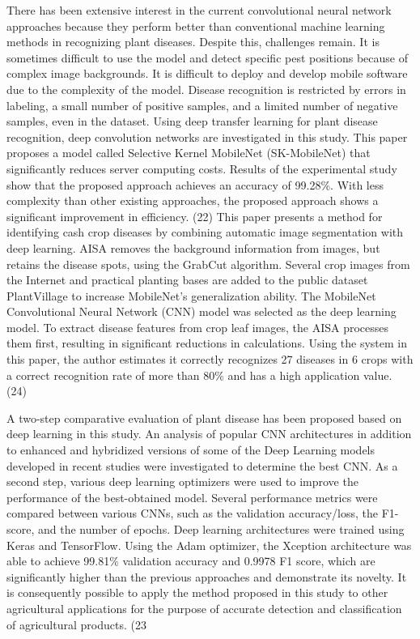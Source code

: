 \documentclass[conference]{IEEEtran}
\begin{document}
There has been extensive interest in the current convolutional neural network approaches because they perform better than conventional machine learning methods in recognizing plant diseases. Despite this, challenges remain. It is sometimes difficult to use the model and detect specific pest positions because of complex image backgrounds. It is difficult to deploy and develop mobile software due to the complexity of the model. Disease recognition is restricted by errors in labeling, a small number of positive samples, and a limited number of negative samples, even in the dataset. Using deep transfer learning for plant disease recognition, deep convolution networks are investigated in this study. This paper proposes a model called Selective Kernel MobileNet (SK-MobileNet) that significantly reduces server computing costs. Results of the experimental study show that the proposed approach achieves an accuracy of 99.28\%. With less complexity than other existing approaches, the proposed approach shows a significant improvement in efficiency. (22) This paper presents a method for identifying cash crop diseases by combining automatic image segmentation with deep learning. AISA removes the background information from images, but retains the disease spots, using the GrabCut algorithm. Several crop images from the Internet and practical planting bases are added to the public dataset PlantVillage to increase MobileNet's generalization ability. The MobileNet Convolutional Neural Network (CNN) model was selected as the deep learning model. To extract disease features from crop leaf images, the AISA processes them first, resulting in significant reductions in calculations. Using the system in this paper, the author estimates it correctly recognizes 27 diseases in 6 crops with a correct recognition rate of more than 80\% and has a high application value. (24) 

A two-step comparative evaluation of plant disease has been proposed based on deep learning in this study. An analysis of popular CNN architectures in addition to enhanced and hybridized versions of some of the Deep Learning models developed in recent studies were investigated to determine the best CNN. As a second step, various deep learning optimizers were used to improve the performance of the best-obtained model. Several performance metrics were compared between various CNNs, such as the validation accuracy/loss, the F1-score, and the number of epochs. Deep learning architectures were trained using Keras and TensorFlow. Using the Adam optimizer, the Xception architecture was able to achieve 99.81\% validation accuracy and 0.9978 F1 score, which are significantly higher than the previous approaches and demonstrate its novelty. It is consequently possible to apply the method proposed in this study to other agricultural applications for the purpose of accurate detection and classification of agricultural products. (23  
\end{document}
